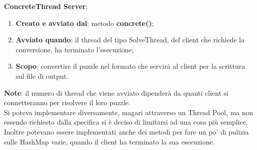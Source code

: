 \textbf{ConcreteThread Server}:
	\begin{enumerate}
		\item \textbf{Creato e avviato dal}: metodo \textbf{concrete()};
		\item \textbf{Avviato quando}: il thread del tipo SolveThread, del client che richiede la conversione, ha terminato l'esecuzione;
		\item \textbf{Scopo}: convertire il puzzle nel formato che servirà al client per la scrittura sul file di output.
	\end{enumerate}
	\noindent
\textbf{Note}: il numero di thread che viene avviato dipenderà da quanti client si connetteranno per risolvere il loro puzzle. \\
Si poteva implementare diversamente, magari attraverso un Thread Pool, ma non essendo richiesto dalla specifica si è deciso di limitarsi ad una cosa più semplice. \\
Inoltre potevano essere implementati anche dei metodi per fare un po' di pulizia sulle HashMap varie, quando il client ha terminato la sua esecuzione.

